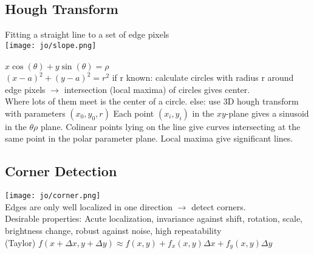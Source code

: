 \subsection*{Hough Transform}
Fitting a straight line to a set of edge pixels\\
\texttt{[image: jo/slope.png]}\\
\\
$x \cos(\theta) + y \sin(\theta) = \rho$ \\
$(x - a)^{2} + (y - a)^{2} = r^{2}$
 if r known: calculate circles with radius r around edge pixels $\rightarrow$ intersection (local maxima) of circles gives center.\\ Where lots of them meet is the center of a circle. else: use 3D hough transform with parameters $(x_0, y_0, r)$
Each point $(x_i, y_i)$ in the $xy$-plane gives a sinusoid in the $\theta \rho$ plane. Colinear points lying on the line give curves intersecting at the same point in the polar parameter plane. Local maxima give significant lines.
\subsection*{Corner Detection}\texttt{[image: jo/corner.png]}\\
Edges are only well localized in one direction $\rightarrow$ detect corners.\\
Desirable properties: Acute localization, invariance against shift, rotation, scale, brightness change, robust against noise, high repeatability\\
 (Taylor) $f(x + \Delta x, y + \Delta y) \approx f(x, y) + f_x(x, y) \Delta x + f_y(x, y)\Delta y$
